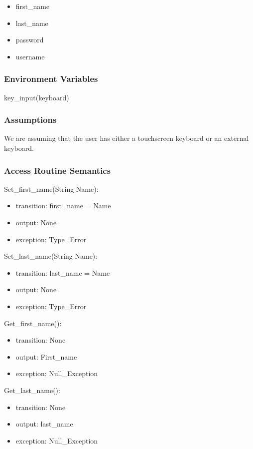\documentclass[12pt, titlepage]{article}
\begin{document}
\begin{itemize}
  \item first\_name
  \item last\_name
  \item password
  \item username
\end{itemize}


\subsubsection{Environment Variables}

key\_input(keyboard)

\subsubsection{Assumptions}

We are assuming that the user has either a touchscreen keyboard or an external keyboard.

\subsubsection{Access Routine Semantics}

\noindent Set\_first\_name(String Name):
\begin{itemize}
\item transition: first\_name = Name
\item output: None
\item exception: Type\_Error 
\end{itemize}

\noindent Set\_last\_name(String Name):
\begin{itemize}
\item transition: last\_name = Name
\item output: None
\item exception: Type\_Error 
\end{itemize}

\noindent Get\_first\_name():
\begin{itemize}
\item transition: None
\item output: First\_name
\item exception: Null\_Exception 
\end{itemize}

\noindent Get\_last\_name():
\begin{itemize}
\item transition: None
\item output: last\_name
\item exception: Null\_Exception 
\end{itemize}
\end{document}
